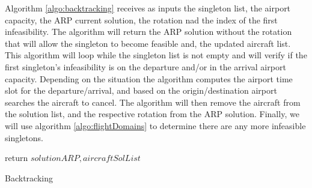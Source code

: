 
Algorithm \ref{algo:backtracking} receives as inputs the singleton list, the airport capacity, the ARP current solution, the rotation nad the index of the first infeasibility. The algorithm will return the ARP solution without the rotation that will allow the singleton to become feasible and, the updated aircraft list. This algorithm will loop while the singleton list is not empty and will verify if the first singleton's infeasibility is on the departure and/or in the arrival airport capacity. Depending on the situation the algorithm computes the airport time slot for the departure/arrival, and based on the origin/destination airport searches the  aircraft to cancel. The algorithm will then remove the aircraft from the solution list, and the respective rotation from the ARP solution. Finally, we will use algorithm \ref{algo:flightDomains} to determine there are any more infeasible singletons.
\begin{algorithm}[H]
	\DontPrintSemicolon
	\While{$ singletonList \ne \{\}$}{
		
		\If{$singletonList(0) = 'dep'$}{
			$startInt \gets 60 * int(singleton^d(0)/60)$\\
			$endInt \gets startInt + 60$\\
			$origin \gets singleton^o(0)$\\
			$flight2Cancel \gets solutionARP[(origin, startInt, endInt)]$\\
			$airc2Cancel \gets updateMulti(flight2Cancel, \mathcal{A}, solutionARP])$\\
			$aircraftSolList \gets aircraftSolList - airc2Cancel$\\
			$solutionARP.pop(airc2Cancel)$\\
			$flightRanges, singletonList, totalCombos \gets domainFlights(\sigma_p(i) \forall i \in [index, |\sigma_p|], \mathcal{A}, index)$\\
		}
		\If{$singleton(0) = 'arr'$}{
			$startInt \gets 60 * int(singleton^a(0)/60)$\\
			$endInt \gets startInt + 60$\\
			$destination \gets singleton^f(0)$\\
			$flight2Cancel \gets solutionARP[(destination, startInt, endInt)]$\\
			$airc2Cancel \gets updateMulti(flight2Cancel, \mathcal{A}, solutionARP)$\\
			$aircraftSolList \gets aircraftSolList - airc2Cancel$\\
			$solutionARP.pop(airc2Cancel)$\\
			$flightRanges, singletonList, totalCombos \gets domainFlights(\sigma_p(i) \forall i \in [index, |\sigma_p|], \mathcal{A}, index)$\\
		}

	}
	return $solutionARP, aircraftSolList$
	\caption{Backtracking}
	\label{algo:backtracking}
\end{algorithm}

